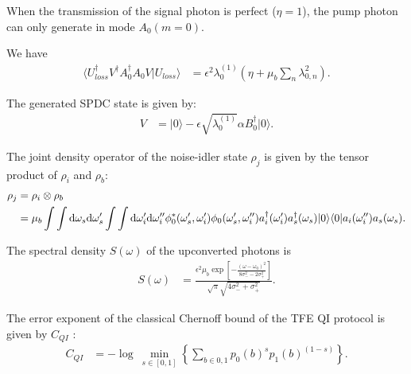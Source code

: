 \documentclass[../../note.tex]{subfiles}
\begin{document}
\begin{proposition}
    When the transmission of the signal photon is perfect ($\eta = 1$), the pump photon can only generate in mode $A_0 (m = 0)$.
\end{proposition}

\begin{lemma}
    We have
    \begin{align}
        \langle U^\dagger_{loss} V^\dagger A_0^\dagger A_0 V \vert U_{loss} \rangle
        &= \epsilon^2 \lambda_{0}^{(1)}(\eta + \mu_b \sum_n \lambda_{0,n}^2).
    \end{align}
\end{lemma}

\begin{definition}
    The generated SPDC state is given by:
    \begin{align}
        V
        &= \vert 0 \rangle - \epsilon \sqrt{\lambda_{0}^{(1)}} \alpha B_{0}^\dagger \vert 0 \rangle.
    \end{align}
\end{definition}

\begin{lemma}
    The joint density operator of the noise-idler state $\rho_j$ is given by the tensor product of $\rho_i$ and $\rho_b$:
    \begin{align}
        \rho_j 
        &= \rho_i \otimes \rho_b \\
        &= \mu_b \int \int {\rm d}\omega_s{\rm d}\omega_s' \int \int {\rm d}\omega_i'{\rm d}\omega_i''\phi_0^\ast(\omega_s', \omega_i') \phi_0(\omega_s', \omega_i'') a_i^\dagger(\omega_i') a_s^\dagger(\omega_s)\vert 0 \rangle \langle 0 \vert a_i(\omega_i'')a_s(\omega_s).
    \end{align}
\end{lemma}

\begin{lemma}
    The spectral density $S(\omega)$ of the upconverted photons is
    \begin{align}
        S(\omega)
        &= \frac{\epsilon^2 \mu_b \exp\left[-\frac{(\omega - \omega_0)^2}{8 \sigma_-^2 - 2 \sigma_+^2}\right]}{\sqrt{\pi} \sqrt{4 \sigma_-^2 + \sigma_+^2}}.
    \end{align}
\end{lemma}

\begin{theorem}
    The error exponent of the classical Chernoff bound of the TFE QI protocol is given by $C_{QI}$ \cite{nussbaum2009chernoff}:
    \begin{align}
        C_{QI}
        &= -\log~\min_{s \in [0,1]} \left\{\sum_{b \in 0,1}p_0(b)^s p_1(b)^{(1-s)}\right\}.
    \end{align}
\end{theorem}
\end{document}
